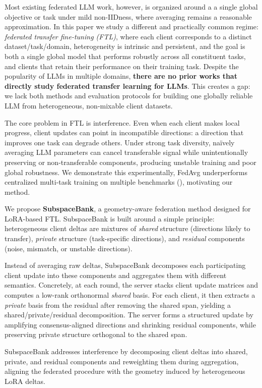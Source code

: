 \documentclass{article}
\theoremstyle{plain}
\theoremstyle{definition}
\theoremstyle{remark}
\begin{document}
Most existing federated LLM work, however, is organized around a a single global objective or task under mild non-IIDness, where averaging remains a reasonable approximation. In this paper we study a different and practically common regime: \emph{federated transfer fine-tuning (FTL)}, where each client corresponds to a distinct dataset/task/domain, heterogeneity is intrinsic and persistent, and the goal is both a single global model that performs robustly across all constituent tasks, and clients that retain their performance on their training task. Despite the popularity of LLMs in multiple domains, \textbf{there are no prior works that directly study federated transfer learning for LLMs}. This creates a gap: we lack both methods and evaluation protocols for building one globally reliable LLM from heterogeneous, non-mixable client datasets.

The core problem in FTL is interference. Even when each client makes local progress, client updates can point in incompatible directions: a direction that improves one task can degrade others. Under strong task diversity, naïvely averaging LLM parameters can cancel transferable signal while unintentionally preserving or non-transferable components, producing unstable training and poor global robustness. We demonstrate this experimentally, FedAvg underperforms centralized multi-task training on multiple benchmarks (), motivating our method.

We propose \textbf{SubspaceBank}, a geometry-aware federation method designed for LoRA-based FTL. SubspaceBank is built around a simple principle: heterogeneous client deltas are mixtures of \emph{shared} structure (directions likely to transfer), \emph{private} structure (task-specific directions), and \emph{residual} components (noise, mismatch, or unstable directions). 

Instead of averaging raw deltas, SubspaceBank decomposes each participating client update into these components and aggregates them with different semantics. Concretely, at each round, the server stacks client update matrices and computes a low-rank orthonormal \emph{shared} basis. For each client, it then extracts a \emph{private} basis from the residual after removing the shared span, yielding a shared/private/residual decomposition. The server forms a structured update by amplifying consensus-aligned directions and shrinking residual components, while preserving private structure orthogonal to the shared span. 

SubspaceBank addresses interference by decomposing client deltas into shared, private, and residual components and reweighting them during aggregation, aligning the federated procedure with the geometry induced by heterogeneous LoRA deltas.
\end{document}
